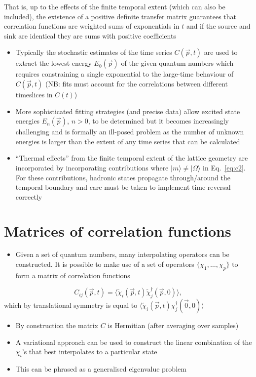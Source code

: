 That is, up to the effects of the finite temporal extent (which can also be included), the existence of a positive definite transfer matrix guarantees that correlation functions are weighted sums of exponentials in $t$ and if the source and sink are identical they are sums with positive coefficients

\begin{itemize}
    \item Typically the stochastic estimates of the time series $C(\vec{p}, t)$ are used to extract the lowest energy $E_0(\vec{p})$ of the given quantum numbers which requires constraining a single exponential to the large-time behaviour of $C(\vec{p},t)$ (NB: fits must account for the correlations between different timeslices in $C(t)$)
    \item More sophisticated fitting strategies (and precise data) allow excited state energies $E_n(\vec{p})$, $n> 0$, to be determined but it becomes increasingly challenging and is formally an ill-posed problem as the number of unknown energies is larger than the extent of any time series that can be calculated
    \item ``Thermal effects'' from the finite temporal extent of the lattice geometry are incorporated by incorporating contributions where $|m \rangle \neq | \Omega \rangle$ in Eq.~\eqref{eq:c2}. For these contributions, hadronic states propagate through/around the temporal boundary and care must be taken to implement time-reversal correctly
\end{itemize}

\section{Matrices of correlation functions}
\begin{itemize}
    \item Given a set of quantum numbers, many interpolating operators can be constructed. It is possible to make use of a set of operators $\{\chi_1, \ldots, \chi_p \}$ to form a matrix of correlation functions
\end{itemize}
\begin{equation}
    C_{ij}(\vec{p}, t) = \langle \tilde{\chi}_i(\vec{p}, t) \tilde{\chi}^\dagger_j(\vec{p}, 0) \rangle,
\end{equation}
which by translational symmetry is equal to $\langle \tilde{\chi}_i(\vec{p}, t) \chi^\dagger_j(\vec{0}, 0) \rangle$

\begin{itemize}
    \item By construction the matrix $C$ is Hermitian (after averaging over samples)
    \item A variational approach can be used to construct the linear combination of the $\chi_i$'s that best interpolates to a particular state
    \item This can be phrased as a generalised eigenvalue problem
\end{itemize}

